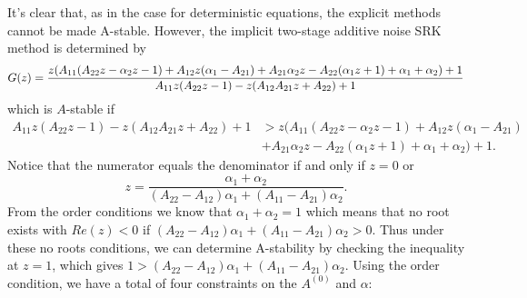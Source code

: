 \documentclass{article}
\begin{document}
It's clear that, as in the case for deterministic equations, the explicit
methods cannot be made A-stable. However, the implicit two-stage additive
noise SRK method is determined by
\begin{equation}
\small
G(z)=\frac{z(A_{11}(A_{22}z-\alpha_{2}z-1)+A_{12}z(\alpha_{1}-A_{21})+A_{21}\ensuremath{\alpha_{2}}z-A_{22}(\alpha_{1}z+1)+\alpha_{1}+\alpha_{2})+1}{A_{11}z(A_{22}z-1)-z(A_{12}A_{21}z+A_{22})+1}\label{eq:SRA_stab2_implicit}
\end{equation}
which is $A$-stable if
\begin{align}
A_{11}z(A_{22}z-1)-z(A_{12}A_{21}z+A_{22})+1&>z(A_{11}(A_{22}z-\alpha_{2}z-1)+A_{12}z(\alpha_{1}-A_{21})\\
&+A_{21}\ensuremath{\alpha_{2}}z-A_{22}(\alpha_{1}z+1)+\alpha_{1}+\alpha_{2})+1.\label{eq:SRA_stab2_ineq}
\end{align}
Notice that the numerator equals the denominator if and only if $z=0$
or
\begin{equation}
z=\frac{\alpha_{1}+\alpha_{2}}{\left(A_{22}-A_{12}\right)\alpha_{1}+\left(A_{11}-A_{21}\right)\alpha_{2}}.\label{eq:SRA_stab2_z}
\end{equation}
From the order conditions we know that $\alpha_{1}+\alpha_{2}=1$
which means that no root exists with $Re(z)<0$ if $\left(A_{22}-A_{12}\right)\alpha_{1}+\left(A_{11}-A_{21}\right)\alpha_{2}>0$.
Thus under these no roots conditions, we can determine A-stability
by checking the inequality at $z=1$, which gives $1>\left(A_{22}-A_{12}\right)\alpha_{1}+\left(A_{11}-A_{21}\right)\alpha_{2}$.
Using the order condition, we have a total of four constraints on
the $A^{(0)}$ and $\alpha$:
\end{document}

